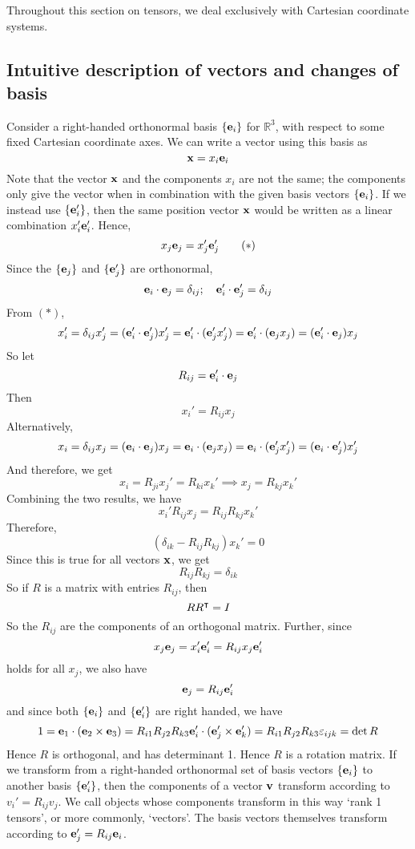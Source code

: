 Throughout this section on tensors, we deal exclusively with Cartesian coordinate systems.
\subsection{Intuitive description of vectors and changes of basis}
Consider a right-handed orthonormal basis \(\{ \vb e_i \}\) for \(\mathbb R^3\), with respect to some fixed Cartesian coordinate axes.
We can write a vector using this basis as
\[
	\vb x = x_i \vb e_i
\]
Note that the vector \(\vb x\) and the components \(x_i\) are not the same; the components only give the vector when in combination with the given basis vectors \(\{ \vb e_i \}\).
If we instead use \(\{ \vb e'_i \}\), then the same position vector \(\vb x\) would be written as a linear combination \(x'_i \vb e'_i\).
Hence,
\begin{equation}
	x_j \vb e_j = x'_j \vb e'_j
	\tag{\(\ast\)}
\end{equation}
Since the \(\{ \vb e_j \}\) and \(\{ \vb e'_j \}\) are orthonormal,
\[
	\vb e_i \cdot \vb e_j = \delta_{ij};\quad \vb e'_i \cdot \vb e'_j = \delta_{ij}
\]
From \((\ast)\),
\[
	x_i' = \delta_{ij} x_j' = (\vb e_i' \cdot \vb e_j') x_j' = \vb e_i' \cdot (\vb e_j' x_j') = \vb e_i' \cdot (\vb e_j x_j) = (\vb e_i' \cdot \vb e_j) x_j
\]
So let
\[
	R_{ij} = \vb e_i' \cdot \vb e_j
\]
Then
\[
	x_i' = R_{ij} x_j
\]
Alternatively,
\[
	x_i = \delta_{ij} x_j = (\vb e_i \cdot \vb e_j) x_j = \vb e_i \cdot (\vb e_j x_j) = \vb e_i \cdot (\vb e_j' x_j') = (\vb e_i \cdot \vb e_j') x_j'
\]
And therefore, we get
\[
	x_i = R_{ji} x_j' = R_{ki} x_k' \implies x_j = R_{kj} x_k'
\]
Combining the two results, we have
\[
	x_i' R_{ij} x_j = R_{ij} R_{kj} x_k'
\]
Therefore,
\[
	(\delta_{ik} - R_{ij}R_{kj}) x_k' = 0
\]
Since this is true for all vectors \(\vb x\), we get
\[
	R_{ij}R_{kj} = \delta_{ik}
\]
So if \(R\) is a matrix with entries \(R_{ij}\), then
\[
	R R^\intercal = I
\]
So the \(R_{ij}\) are the components of an orthogonal matrix.
Further, since
\[
	x_j \vb e_j = x_i' \vb e_i' = R_{ij} x_j \vb e_i'
\]
holds for all \(x_j\), we also have
\[
	\vb e_j = R_{ij} \vb e_i'
\]
and since both \(\{ \vb e_i \}\) and \(\{ \vb e_i' \}\) are right handed, we have
\[
	1 = \vb e_1 \cdot (\vb e_2 \times \vb e_3) = R_{i1} R_{j2} R_{k3} \vb e_i' \cdot (\vb e_j' \times \vb e_k') = R_{i1} R_{j2} R_{k3} \varepsilon_{ijk} = \det R
\]
Hence \(R\) is orthogonal, and has determinant 1.
Hence \(R\) is a rotation matrix.
If we transform from a right-handed orthonormal set of basis vectors \(\{ \vb e_i \}\) to another basis \(\{ \vb e_i' \}\), then the components of a vector \(\vb v\) transform according to \(v_i' = R_{ij} v_j\).
We call objects whose components transform in this way `rank 1 tensors', or more commonly, `vectors'.
The basis vectors themselves transform according to \(\vb e_j' = R_{ij} \vb e_i\).

